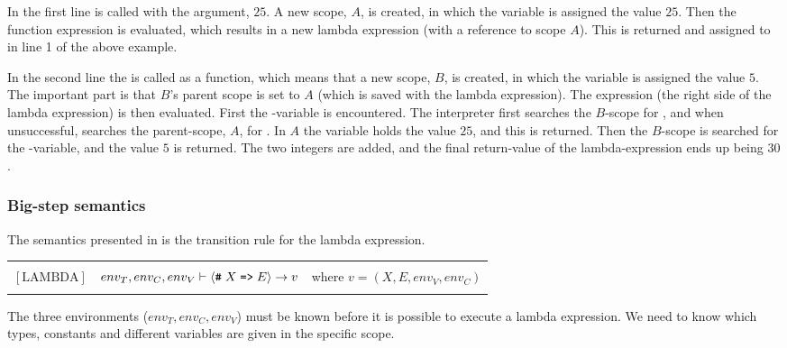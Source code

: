 
In the first line  is called with the argument, $25$. A new scope, $A$,
is created, in which the variable  is assigned the value $25$. Then the function
expression is evaluated, which results in a new lambda expression (with a reference to scope $A$).
This is returned and assigned to  in line 1 of the above example.

In the second line the  is called as a function, which means that a new scope, $B$,
is created, in which the variable  is assigned the value $5$. The important part is
that $B$'s parent scope is set to $A$ (which is saved with the lambda expression). The expression
(the right side of the lambda expression) is then evaluated. First the -variable is
encountered. The interpreter first searches the $B$-scope for , and when unsuccessful,
searches the parent-scope, $A$, for . In $A$ the variable  holds the value
$25$, and this is returned. Then the $B$-scope is searched for the -variable, and the value
$5$ is returned. The two integers are added, and the final return-value of the lambda-expression
ends up being $30$.

\subsubsection{Big-step semantics}

The semantics presented in  is the transition rule for the lambda expression. 

\begin{table}[ht]
  \begin{tabular*}{\textwidth}{l l c}
    \hline \\
    \hspace{0.5cm} $[\mbox{LAMBDA}]$ & $env_{T}, env_{C}, env_{V} \vdash \langle \texttt{\#} \; X\;
    \texttt{=>}\; E \rangle \rightarrow v$ & \hspace{1cm} where $v = \left(X, E, env_{V}, env_{C}\right)$ \\
    & & \\
    \hline
  \end{tabular*}
  \label{semantic:lambda}
\end{table}

The three environments ($env_{T}, env_{C}, env_{V}$) must be known before it is
possible to execute a lambda expression. We need to know which types, constants
and different variables are given in the specific scope.

